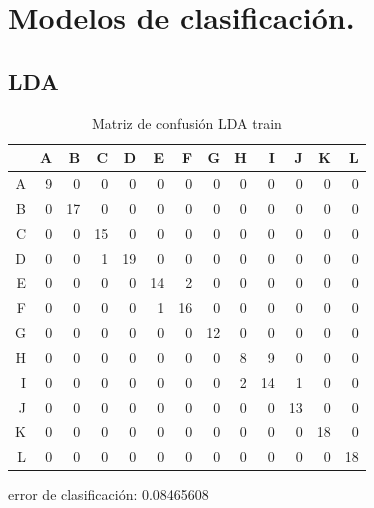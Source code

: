 \documentclass[pdf]{beamer}
\begin{document}
\section{Modelos de clasificación.}
\subsection{LDA}
\begin{frame}

\begin{table}[ht]
\begin{adjustbox}{width= 3.5in,center}
\centering
\begin{tabular}{rrrrrrrrrrrrr}
  \hline
 & A & B & C & D & E & F & G & H & I & J & K & L \\ 
  \hline
A &   9 &   0 &   0 &   0 &   0 &   0 &   0 &   0 &   0 &   0 &   0 &   0 \\ 
  B &   0 &  17 &   0 &   0 &   0 &   0 &   0 &   0 &   0 &   0 &   0 &   0 \\ 
  C &   0 &   0 &  15 &   0 &   0 &   0 &   0 &   0 &   0 &   0 &   0 &   0 \\ 
  D &   0 &   0 &   1 &  19 &   0 &   0 &   0 &   0 &   0 &   0 &   0 &   0 \\ 
  E &   0 &   0 &   0 &   0 &  14 &   2 &   0 &   0 &   0 &   0 &   0 &   0 \\ 
  F &   0 &   0 &   0 &   0 &   1 &  16 &   0 &   0 &   0 &   0 &   0 &   0 \\ 
  G &   0 &   0 &   0 &   0 &   0 &   0 &  12 &   0 &   0 &   0 &   0 &   0 \\ 
  H &   0 &   0 &   0 &   0 &   0 &   0 &   0 &   8 &   9 &   0 &   0 &   0 \\ 
  I &   0 &   0 &   0 &   0 &   0 &   0 &   0 &   2 &  14 &   1 &   0 &   0 \\ 
  J &   0 &   0 &   0 &   0 &   0 &   0 &   0 &   0 &   0 &  13 &   0 &   0 \\ 
  K &   0 &   0 &   0 &   0 &   0 &   0 &   0 &   0 &   0 &   0 &  18 &   0 \\ 
  L &   0 &   0 &   0 &   0 &   0 &   0 &   0 &   0 &   0 &   0 &   0 &  18 \\ 
   \hline
\end{tabular}
\end{adjustbox}
	\label{tabla:confusionLDAtrain}
	\caption{Matriz de confusión LDA train}
\end{table}

error de clasificación:  0.08465608
\end{frame}
\end{document}
